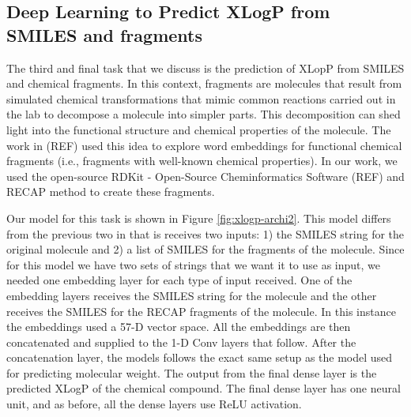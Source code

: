     \subsection{Deep Learning to Predict XLogP from SMILES and fragments}
    The third and final task that we discuss is the prediction of XLopP from SMILES and chemical fragments. In this context, 
    fragments are molecules that result from simulated chemical transformations  that mimic  common reactions carried out in the lab to decompose a molecule into simpler parts. This decomposition can shed light into the functional structure and chemical properties of the molecule. The work in (REF) used this idea to explore word embeddings for functional chemical fragments 
    (i.e., fragments with well-known chemical properties). In our work, we used the open-source RDKit - Open-Source Cheminformatics Software   (REF) and RECAP method to create these fragments.
    
    Our model for this task is shown in Figure \ref{fig:xlogp-archi2}. This model differs from the previous two in that is receives two inputs: 1) the SMILES string for the original molecule and 2) a list of SMILES for the fragments of the molecule. Since for this model we have two sets of strings that we want it to use as input, we needed one embedding layer for each type of input received. One of the embedding layers receives the SMILES string for the molecule and the other receives the SMILES for the RECAP fragments of the molecule. In this instance
    the embeddings used a 57-D vector space. All the embeddings are then concatenated and supplied to the 1-D Conv layers that follow. 
    After the concatenation layer, the models follows the exact same setup as the model used for predicting molecular weight. The output from the final dense layer is the predicted XLogP of the chemical compound.  The final dense layer has one neural unit, and as before, all the dense layers use ReLU activation. 
    
    

